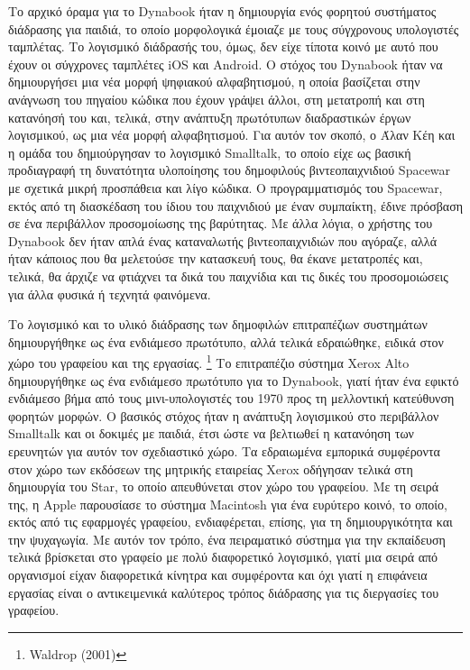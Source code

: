 \documentclass[
]{article}
\begin{document}
Το αρχικό όραμα για το Dynabook ήταν η δημιουργία ενός φορητού
συστήματος διάδρασης για παιδιά, το οποίο μορφολογικά έμοιαζε με τους
σύγχρονους υπολογιστές ταμπλέτας. Το λογισμικό διάδρασής του, όμως, δεν
είχε τίποτα κοινό με αυτό που έχουν οι σύγχρονες ταμπλέτες iOS και
Android. Ο στόχος του Dynabook ήταν να δημιουργήσει μια νέα μορφή
ψηφιακού αλφαβητισμού, η οποία βασίζεται στην ανάγνωση του πηγαίου
κώδικα που έχουν γράψει άλλοι, στη μετατροπή και στη κατανόησή του και,
τελικά, στην ανάπτυξη πρωτότυπων διαδραστικών έργων λογισμικού, ως μια
νέα μορφή αλφαβητισμού. Για αυτόν τον σκοπό, ο Άλαν Κέη και η ομάδα του
δημιούργησαν το λογισμικό Smalltalk, το οποίο είχε ως βασική προδιαγραφή
τη δυνατότητα υλοποίησης του δημοφιλούς βιντεοπαιχνιδιού Spacewar με
σχετικά μικρή προσπάθεια και λίγο κώδικα. Ο προγραμματισμός του
Spacewar, εκτός από τη διασκέδαση του ίδιου του παιχνιδιού με έναν
συμπαίκτη, έδινε πρόσβαση σε ένα περιβάλλον προσομοίωσης της βαρύτητας.
Με άλλα λόγια, ο χρήστης του Dynabook δεν ήταν απλά ένας καταναλωτής
βιντεοπαιχνιδιών που αγόραζε, αλλά ήταν κάποιος που θα μελετούσε την
κατασκευή τους, θα έκανε μετατροπές και, τελικά, θα άρχιζε να φτιάχνει
τα δικά του παιχνίδια και τις δικές του προσομοιώσεις για άλλα φυσικά ή
τεχνητά φαινόμενα.

Το λογισμικό και το υλικό διάδρασης των δημοφιλών επιτραπέζιων
συστημάτων δημιουργήθηκε ως ένα ενδιάμεσο πρωτότυπο, αλλά τελικά
εδραιώθηκε, ειδικά στον χώρο του γραφείου και της εργασίας. \footnote{Waldrop
  (2001)} Το επιτραπέζιο σύστημα Xerox Alto δημιουργήθηκε ως ένα
ενδιάμεσο πρωτότυπο για το Dynabook, γιατί ήταν ένα εφικτό ενδιάμεσο
βήμα από τους μινι-υπολογιστές του 1970 προς τη μελλοντική κατεύθυνση
φορητών μορφών. Ο βασικός στόχος ήταν η ανάπτυξη λογισμικού στο
περιβάλλον Smalltalk και οι δοκιμές με παιδιά, έτσι ώστε να βελτιωθεί η
κατανόηση των ερευνητών για αυτόν τον σχεδιαστικό χώρο. Τα εδραιωμένα
εμπορικά συμφέροντα στον χώρο των εκδόσεων της μητρικής εταιρείας Xerox
οδήγησαν τελικά στη δημιουργία του Star, το οποίο απευθύνεται στον χώρο
του γραφείου. Με τη σειρά της, η Apple παρουσίασε το σύστημα Macintosh
για ένα ευρύτερο κοινό, το οποίο, εκτός από τις εφαρμογές γραφείου,
ενδιαφέρεται, επίσης, για τη δημιουργικότητα και την ψυχαγωγία. Με αυτόν
τον τρόπο, ένα πειραματικό σύστημα για την εκπαίδευση τελικά βρίσκεται
στο γραφείο με πολύ διαφορετικό λογισμικό, γιατί μια σειρά από
οργανισμοί είχαν διαφορετικά κίνητρα και συμφέροντα και όχι γιατί η
επιφάνεια εργασίας είναι ο αντικειμενικά καλύτερος τρόπος διάδρασης για
τις διεργασίες του γραφείου.
\end{document}
